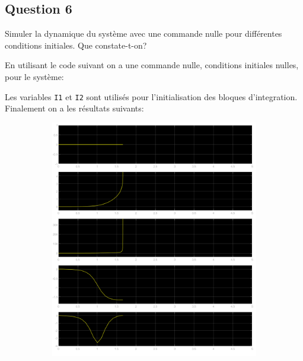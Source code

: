 \documentclass[class=article, crop=false]{standalone}
\begin{document}
\newpage
\subsection{Question 6}
\begin{exercise}
    Simuler la dynamique du système avec une commande nulle pour différentes conditions initiales. Que constate-t-on?
\end{exercise}
\begin{resolution}
    En utilisant le code suivant on a une commande nulle, conditions initiales nulles, pour le système:
    \begin{scriptsize}\mycode
        
        
        
    \end{scriptsize}
    Les variables \texttt{I1} et \texttt{I2} sont utilisés pour l'initialisation des bloques d'integration. Finalement on a les résultats suivants:
    \begin{figure}[H]
        \centering
        \begin{subfigure}[b]{0.475\textwidth}
            \centering
            \includegraphics[width=\textwidth]{../images/simulink_scope2_0_01.png}

\end{subfigure}
\end{figure}
\end{resolution}
\end{document}
